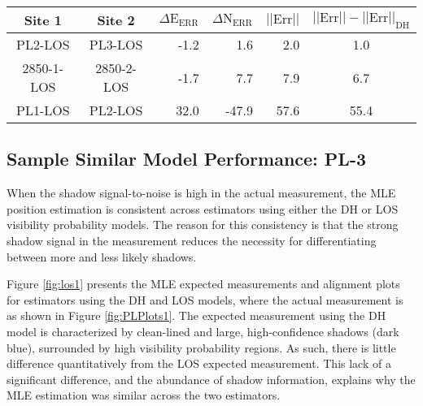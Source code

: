 \begin{center}
	\begin{tabular}{|c|c|r|r|r|c|}
		\hline
		Site 1 & Site 2 & $\Delta \text{E}_\textrm{ERR}$ & $\Delta \text{N}_\textrm{ERR}$ & $||\text{Err}||$ & $||\text{Err}|| - ||\text{Err}||_{\text{DH}}$ \\ \hline
		PL2-LOS & PL3-LOS & -1.2 & 1.6 & 2.0 & 1.0 \\ \hline
		2850-1-LOS & 2850-2-LOS &  -1.7 & 7.7 & 7.9 & 6.7 \\ \hline 
		PL1-LOS & PL2-LOS & 32.0 & -47.9 & 57.6 & 55.4 \\ \hline
	\end{tabular}
	\label{tab:offsetsLOS} 
\end{center}

\subsection{Sample Similar Model Performance: PL-3}
\label{rov.LOS.PL3}

When the shadow signal-to-noise is high in the actual measurement, the MLE position estimation is consistent across estimators using either the DH or LOS visibility probability models.  
The reason for this consistency is that the strong shadow signal in the measurement reduces the necessity for differentiating between more and less likely shadows.

Figure \ref{fig:los1} presents the MLE expected measurements and alignment plots for estimators using the DH and LOS models, where the actual measurement is as shown in Figure \ref{fig:PLPlots1}.
The expected measurement using the DH model is characterized by clean-lined and large, high-confidence shadows (dark blue), surrounded by high visibility probability regions.
As such, there is little difference quantitatively from the LOS expected measurement.
This lack of a significant difference, and the abundance of shadow information, explains why the MLE estimation was similar across the two estimators.

